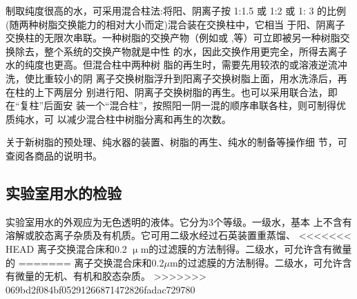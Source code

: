 制取纯度很高的水，可采用混合柱法:将阳、阴离子按 1:1.5 或 1:2 或 1:
3 的比例(随两种树脂交换能力的相对大小而定)混合装在交换柱中，它相当
于阳、阴离子交换柱的无限次串联。一种树脂的交换产物（例如或
,等）可立即被另一种树脂交换除去，整个系统的交换产物就是中性
的水，因此交换作用更完全，所得去离子水的纯度也更高。但混合柱中两种树
脂的再生时，需要先用较浓的或溶液逆流冲洗，使比重较小的阴
离子交换树脂浮升到阳离子交换树脂上面，用水洗涤后，再在柱的上下两层分
别进行阳、阴离子交换树脂的再生。也可以采用联合法，即在“复柱”后面安
装一个“混合柱”，按照阳一阴一混的顺序串联各柱，则可制得优质纯水，可
以减少混合柱中树脂分离和再生的次数。

关于新树脂的预处理、纯水器的装置、树脂的再生、纯水的制备等操作细
节，可查阅各商品的说明书。


\subsection{实验室用水的检验}

实验室用水的外观应为无色透明的液体。它分为3个等级。一级水，基本
上不含有溶解或胶态离子杂质及有机质。它可用二级水经过石英装置重蒸馏、
<<<<<<< HEAD
离子交换混合床和0.2 $\upmu$m的过滤膜的方法制得。二级水，可允许含有微量的
=======
离子交换混合床和0.2$\mu$m的过滤膜的方法制得。二级水，可允许含有微量的无机、有机和胶态杂质。
>>>>>>> 069bd2f084bf05291266871472826fadac729780
